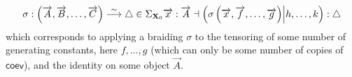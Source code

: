 \documentclass[pra,floatfix,
amsmath,superscriptaddress, 12pt]{article}
\theoremstyle{definition}
\newcommand{\coev}{\mathsf{coev}}
\begin{document}
\begin{itemize}
\[{                %
                \sigma:\left(
                    \overrightarrow{A},
                    \overrightarrow{B},
                    \dots,
                    \overrightarrow{C}
                    \right) \overset{\sim}{\longrightarrow} \bigtriangleup \in \Sigma_{\mathbf{X}_0}
            }{
                \overrightarrow{x}:\overrightarrow{A} \dashv \left(
                                                                \sigma \left(
                                                                    \overrightarrow{x},
                                                                    \overrightarrow{f},
                                                                    \dots,
                                                                    \overrightarrow{g}
                                                                \right)
                                                                \middle|
                                                                h,\dots,k
                                                             \right):\bigtriangleup
            }
            \]
            which corresponds to applying a braiding $\sigma$ to the tensoring of some number of generating constants, here $f,\dots,g$ (which can only be some number of copies of $\coev$), and the identity on some object $\overrightarrow{A}$.
\end{itemize}
\end{document}
